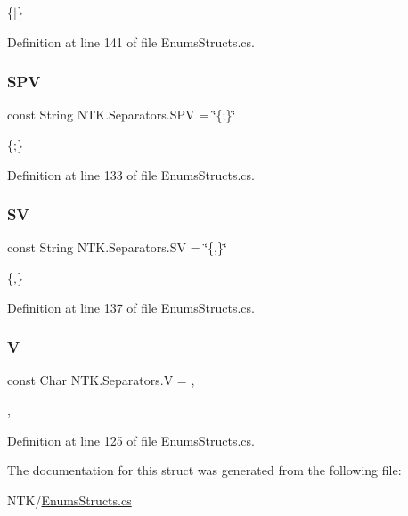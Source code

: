 \{$\vert$\} 



Definition at line 141 of file Enums\+Structs.\+cs.

\mbox{\label{struct_n_t_k_1_1_separators_a6bee799713d32d320f3a4fd17a5882f5}} 
\subsubsection{\texorpdfstring{SPV}{SPV}}
{\footnotesize\ttfamily const String N\+T\+K.\+Separators.\+S\+PV = \char`\"{}\{;\}\char`\"{}}



\{;\} 



Definition at line 133 of file Enums\+Structs.\+cs.

\mbox{\label{struct_n_t_k_1_1_separators_a3c9d04d23a6399e4d7857b10a7b5206b}} 
\subsubsection{\texorpdfstring{SV}{SV}}
{\footnotesize\ttfamily const String N\+T\+K.\+Separators.\+SV = \char`\"{}\{,\}\char`\"{}}



\{,\} 



Definition at line 137 of file Enums\+Structs.\+cs.

\mbox{\label{struct_n_t_k_1_1_separators_a1117cf18684a7acc7b5f90feb2252356}} 
\subsubsection{\texorpdfstring{V}{V}}
{\footnotesize\ttfamily const Char N\+T\+K.\+Separators.\+V = \textquotesingle{},\textquotesingle{}}



, 



Definition at line 125 of file Enums\+Structs.\+cs.



The documentation for this struct was generated from the following file\+:\begin{DoxyCompactItemize}
\item 
N\+T\+K/\mbox{\hyperlink{_enums_structs_8cs}{Enums\+Structs.\+cs}}\end{DoxyCompactItemize}
